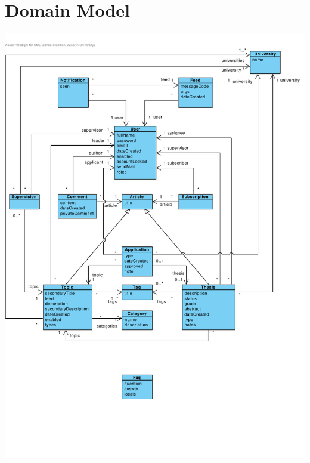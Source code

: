 \documentclass[11pt,oneside]{fithesis2}
\begin{document}
\section{Domain Model}
\includegraphics[keepaspectratio, trim=0 100 10 30, clip, width=\textwidth]{./images/domain-model.pdf}
\end{document}
